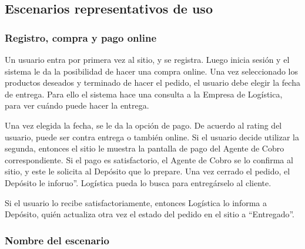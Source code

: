 \newpage
\subsection{Escenarios representativos de uso}
  
  \subsubsection{Registro, compra y pago online}

  Un usuario entra por primera vez al sitio, y se registra. Luego inicia sesión y el sistema le da la posibilidad de hacer una compra online. Una vez seleccionado los productos deseados y terminado de hacer el pedido, el usuario debe elegir la fecha de entrega. Para ello el sistema hace una consulta a la Empresa de Logística, para ver cuándo puede hacer la entrega. 
  
  Una vez elegida la fecha, se le da la opción de pago. De acuerdo al rating del usuario, puede ser contra entrega o también online. Si el usuario decide utilizar la segunda, entonces el sitio le muestra la pantalla de pago del Agente de Cobro correspondiente. Si el pago es satisfactorio, el Agente de Cobro se lo confirma al sitio, y este le solicita al Depósito que lo prepare. Una vez cerrado el pedido, el Depósito le inforuo”. Logística pueda lo busca para entregárselo al cliente. 
  
  Si el usuario lo recibe satisfactoriamente, entonces Logística lo informa a Depósito, quién actualiza otra vez el estado del pedido en el sitio a “Entregado”. 

  \subsubsection{Nombre del escenario}

  \fixme